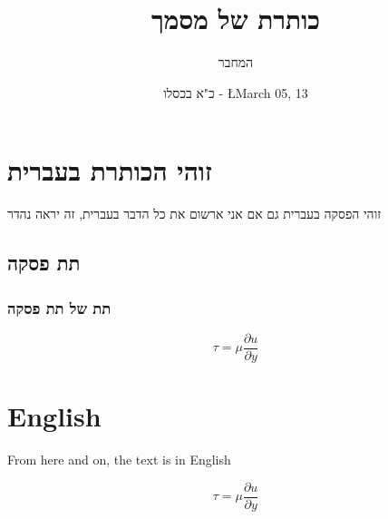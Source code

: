 \documentclass{article}
\title{כותרת של מסמך}
\author{המחבר}
\date{כ"א בכסלו - \L{March 05, 13}}
\begin{document}
\maketitle



\section{זוהי הכותרת בעברית}
זוהי הפסקה בעברית
גם אם אני ארשום את כל הדבר בעברית, זה יראה נהדר

\subsection{תת פסקה}
\subsubsection{תת של תת פסקה}


\begin{equation}\label{eq:visc}
\tau = \mu \frac{\partial u}{\partial y}
\end{equation}

\section{English}

From here and on, the text is in English

\begin{equation}\label{eq:visc}
\tau = \mu \frac{\partial u}{\partial y}
\end{equation}
\end{document}
